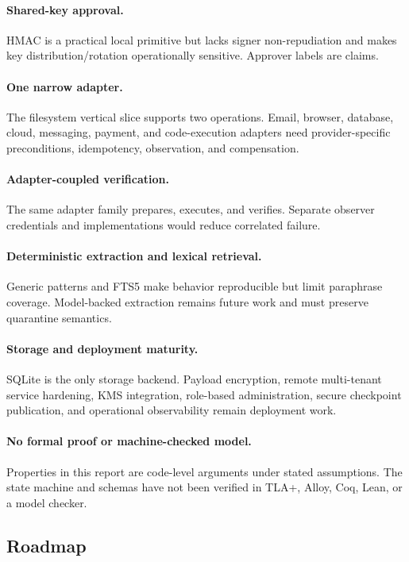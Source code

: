 \paragraph{Shared-key approval.} HMAC is a practical local primitive but lacks signer non-repudiation and makes key distribution/rotation operationally sensitive. Approver labels are claims.

\paragraph{One narrow adapter.} The filesystem vertical slice supports two operations. Email, browser, database, cloud, messaging, payment, and code-execution adapters need provider-specific preconditions, idempotency, observation, and compensation.

\paragraph{Adapter-coupled verification.} The same adapter family prepares, executes, and verifies. Separate observer credentials and implementations would reduce correlated failure.

\paragraph{Deterministic extraction and lexical retrieval.} Generic patterns and FTS5 make behavior reproducible but limit paraphrase coverage. Model-backed extraction remains future work and must preserve quarantine semantics.

\paragraph{Storage and deployment maturity.} SQLite is the only storage backend. Payload encryption, remote multi-tenant service hardening, KMS integration, role-based administration, secure checkpoint publication, and operational observability remain deployment work.

\paragraph{No formal proof or machine-checked model.} Properties in this report are code-level arguments under stated assumptions. The state machine and schemas have not been verified in TLA+, Alloy, Coq, Lean, or a model checker.

\subsection{Roadmap}

